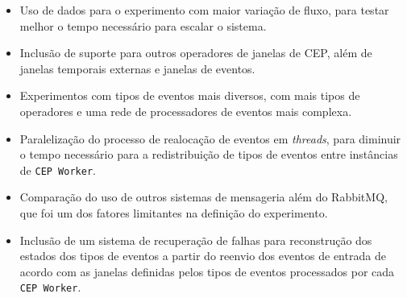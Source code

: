 \begin{itemize}
    \item Uso de dados para o experimento com maior variação de fluxo, para testar melhor o tempo necessário para escalar o sistema.
    \item Inclusão de suporte para outros operadores de janelas de CEP, além de janelas temporais externas e janelas de eventos.
    \item Experimentos com tipos de eventos mais diversos, com mais tipos de operadores e uma rede de processadores de eventos mais complexa.
    \item Paralelização do processo de realocação de eventos em \textit{threads}, para diminuir o tempo necessário para a redistribuição de tipos de eventos entre instâncias de \texttt{CEP Worker}.
    \item Comparação do uso de outros sistemas de mensageria além do RabbitMQ, que foi um dos fatores limitantes na definição do experimento.
    \item Inclusão de um sistema de recuperação de falhas para reconstrução dos estados dos tipos de eventos a partir do reenvio dos eventos de entrada de acordo com as janelas definidas pelos tipos de eventos processados por cada \texttt{CEP Worker}.
\end{itemize}

